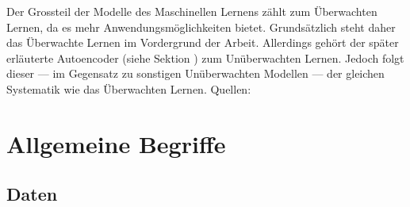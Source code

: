 Der Grossteil der Modelle des Maschinellen Lernens zählt zum Überwachten
Lernen, da es mehr Anwendungsmöglichkeiten bietet. Grundsätzlich steht
daher das Überwachte Lernen im Vordergrund der Arbeit. Allerdings gehört der
später erläuterte Autoencoder (siehe Sektion ) zum
Unüberwachten Lernen. Jedoch folgt dieser --- im Gegensatz zu sonstigen
Unüberwachten Modellen --- der
gleichen Systematik wie das Überwachten Lernen.
\para{}
Quellen: \cite{Goodfellow-et-al-2016} \cite{book:hands-on}

\section{Allgemeine Begriffe}

\subsection{Daten}

